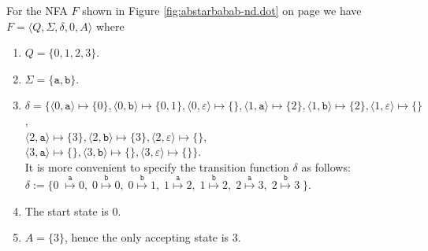 \exampleEng
For the \textsc{NFA} $F$ shown in Figure \ref{fig:abstarbabab-nd.dot} on page \pageref{fig:abstarbabab-nd.dot} 
we have
\\[0.2cm]
\hspace*{1.3cm}
$F = \langle Q, \Sigma, \delta, 0, A\rangle$ \quad where
\begin{enumerate}
\item $Q = \{ 0, 1, 2, 3 \}$.
\item $\Sigma = \{ \texttt{a}, \texttt{b} \}$.
\item $\delta = \bigl\{ 
       \langle 0, \texttt{a}  \rangle \mapsto \{ 0 \},
       \langle 0, \texttt{b}  \rangle \mapsto \{ 0, 1 \},
       \langle 0, \varepsilon \rangle \mapsto \{ \},
       \langle 1, \texttt{a}  \rangle \mapsto \{ 2 \},
       \langle 1, \texttt{b}  \rangle \mapsto \{ 2 \},
       \langle 1, \varepsilon \rangle \mapsto \{  \}$,
      \\[0.2cm]
      \hspace*{0.74cm}
      $\langle 2, \texttt{a}  \rangle \mapsto \{ 3 \},
       \langle 2, \texttt{b}  \rangle \mapsto \{ 3 \}, 
       \langle 2, \varepsilon \rangle \mapsto \{ \},$
      \\[0.2cm]
      \hspace*{0.74cm}
      $\langle 3, \texttt{a}  \rangle \mapsto \{\},
       \langle 3, \texttt{b}  \rangle \mapsto \{\}, 
       \langle 3, \varepsilon \rangle \mapsto \{\}\bigr\}$.
      \\[0.2cm]
      It is more convenient to specify the transition function $\delta$ as follows:
      \\[0.2cm]
      \hspace*{1.3cm}
       $\delta := \bigl\{0\;  \stackrel{\texttt{a}}{\mapsto} 0,\;
        0 \stackrel{\texttt{b}}{\mapsto} 0,\;
        0 \stackrel{\texttt{b}}{\mapsto} 1,\;
        1 \stackrel{\texttt{a}}{\mapsto} 2,\;
        1 \stackrel{\texttt{b}}{\mapsto} 2,\;
        2 \stackrel{\texttt{a}}{\mapsto} 3,\;
       2 \stackrel{\texttt{b}}{\mapsto} 3\;\bigr\}$.
\item The start state is $0$.
\item $A = \{ 3 \}$, hence the only accepting state is $3$. \eox
\end{enumerate}
\vspace*{0.3cm}

